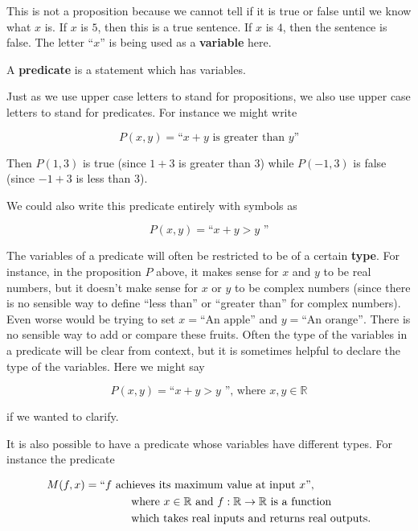 This is not a proposition because we cannot tell if it is true or false until we know what $x$ is.  If $x$ is $5$, then this is a true sentence.  If $x$ is $4$, then the sentence is false.  The letter ``$x$'' is being used as a \textbf{variable} here.  

\begin{definition} 
A \textbf{predicate} is a statement which has variables.  
\end{definition}

Just as we use upper case letters to stand for propositions, we also use upper case letters to stand for predicates.  For instance we might write

\[
P(x,y) =  \textrm{``$x+ y$ is greater than $y$''} 
\]

Then $P(1,3)$ is true (since $1+3$ is greater than $3$) while $P(-1,3)$ is false (since $-1+3$ is less than $3$).

We could also write this predicate entirely with symbols as 

\[
P(x,y) =  \textrm{``$x+ y > y$ ''} 
\]

The variables of a predicate will often be restricted to be of a certain \textbf{type}.  For instance, in the proposition $P$ above, it makes sense for $x$ and $y$ to be real numbers, but it doesn't make sense for $x$ or $y$ to be complex numbers (since there is no sensible way to define ``less than'' or ``greater than'' for complex numbers).  Even worse would be trying to set $x = \textrm{``An apple''}$ and $y = \textrm{``An orange''}$.  There is no sensible way to add or compare these fruits.  Often the type of the variables in a predicate will be clear from context, but it is sometimes helpful to declare the type of the variables.  Here we might say

\[
P(x,y) =  \textrm{``$x+ y > y$ '', where $x,y \in \mathbb{R}$} 
\]

if we wanted to clarify.

It is also possible to have a predicate whose variables have different types.  For instance the predicate

\begin{align*}
M(f,x) &=  \textrm{``$f$ achieves its maximum value at input $x$'',}\\ 
	&  \textrm{ \hphantom{fdsfdsds} where $x\in \mathbb{R}$ and $f: \mathbb{R} \to \mathbb{R}$ is a function} \\
	& \textrm{ \hphantom{fdsfdsds} which takes real inputs and returns real outputs.}
\end{align*}


